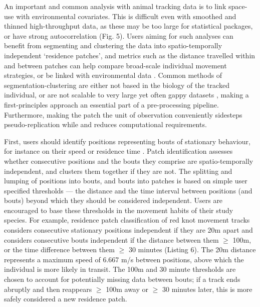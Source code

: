 \documentclass[10pt,paper=a4,headings=standardclasses
]{scrartcl}
\begin{document}
An important and common analysis with animal tracking data is to link space-use with environmental covariates.
This is difficult even with smoothed and thinned high-throughput data, as these may be too large for statistical packages, or have strong autocorrelation (Fig. 5).
Users aiming for such analyses can benefit from segmenting and clustering the data into spatio-temporally independent `residence patches', and metrics such as the distance travelled within and between patches can help compare broad-scale individual movement strategies, or be linked with environmental data \citep{bijleveld2016, oudman2018, barraquand2008}.
Common methods of segmentation-clustering are either not based in the biology of the tracked individual, or are not scalable to very large yet often gappy datasets \citep{patin2020a}, making a first-principles approach an essential part of a pre-processing pipeline.
Furthermore, making the patch the unit of observation conveniently sidesteps pseudo-replication while and reduces computational requirements.

First, users should identify positions representing bouts of stationary behaviour, for instance on their speed or residence time \citep{bracis2018}.
Patch identification assesses whether consecutive positions and the bouts they comprise are spatio-temporally independent, and clusters them together if they are not.
The splitting and lumping of positions into bouts, and bouts into patches is based on simple user specified thresholds --- the distance and the time interval between positions (and bouts) beyond which they should be considered independent.
Users are encouraged to base these thresholds in the movement habits of their study species.
For example, residence patch classification of red knot movement tracks considers consecutive stationary positions independent if they are 20m apart and considers consecutive bouts independent if the distance between them $\geq$ 100m, or the time difference between them $\geq$ 30 minutes (Listing 6).
The 20m distance represents a maximum speed of 6.667 m/s between positions, above which the individual is more likely in transit.
The 100m and 30 minute thresholds are chosen to account for potentially missing data between bouts; if a track ends abruptly and then reappears $\geq$ 100m away or $\geq$ 30 minutes later, this is more safely considered a new residence patch.
\end{document}
